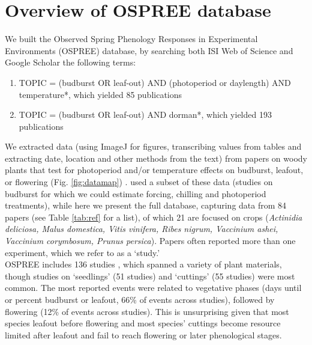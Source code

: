 \documentclass[11pt]{article}
\begin{document}
\section{Overview of OSPREE database}
We built the Observed Spring Phenology Responses in Experimental Environments (OSPREE) database, by searching both ISI Web of Science and Google Scholar  the following terms: 
\begin{enumerate}
\item TOPIC = (budburst OR leaf-out) AND (photoperiod or daylength) AND temperature*, which yielded 85 publications
\item TOPIC = (budburst OR leaf-out) AND dorman*, which yielded 193 publications
\end{enumerate}
We extracted data (using ImageJ for figures, transcribing values from tables and extracting date, location and other methods from the text) from papers on woody plants that test for photoperiod and/or temperature effects on budburst, leafout, or flowering  (Fig. \ref{fig:datamap}) . \citet{ettinger2020} used a subset of these data (studies on budburst for which we could estimate forcing, chilling and photoperiod treatments), while here we present the full database, capturing data from 84 papers (see Table \ref{tab:ref} for a list), of which 21 are focused on crops (\emph{Actinidia deliciosa, Malus domestica, Vitis vinifera, Ribes nigrum, Vaccinium ashei, Vaccinium corymbosum, Prunus persica}). Papers often reported more than one experiment, which we refer to as a `study.' \\

OSPREE includes 136 studies \citep[with the earliest study was conducted in 1947,see][]{Lamb:1948aa}, which spanned a variety of plant materials, though studies on `seedlings' (51 studies) and `cuttings' (55 studies) were most common. The most reported events were related to vegetative phases (days until or percent budburst or leafout, 66\% of events across studies), followed by flowering (12\% of events across studies). This is unsurprising given that most species leafout before flowering and most species' cuttings become resource limited after leafout and fail to reach flowering or later phenological stages.\\
\end{document}
